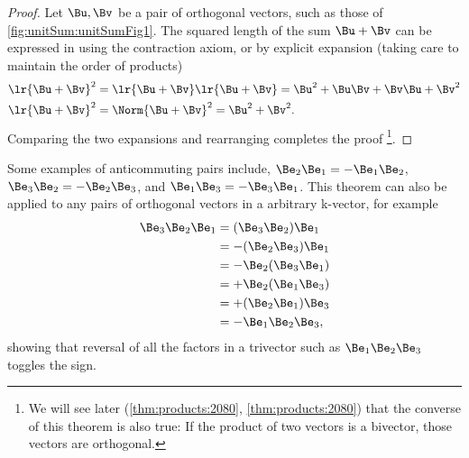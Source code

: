%
%

\begin{proof}
Let \( \Bu, \Bv \) be a pair of orthogonal vectors, such as those of
\cref{fig:unitSum:unitSumFig1}.  The squared length of the sum \( \Bu + \Bv \) can be expressed in using
the contraction axiom, or by explicit expansion (taking care to maintain the order of products)
\begin{align*}
\lr{ \Bu + \Bv }^2 &= \lr{ \Bu + \Bv }\lr{ \Bu + \Bv } = \Bu^2 + \Bu \Bv + \Bv \Bu + \Bv^2 \\
\lr{ \Bu + \Bv }^2 &= \Norm{ \Bu + \Bv }^2 = \Bu^2 + \Bv^2.
\end{align*}
Comparing the two expansions and rearranging completes the proof%
\footnote{We will see later (\cref{thm:products:2080}, \cref{thm:products:2080}) that the converse of this theorem is also true: If the product of two vectors is a bivector, those vectors are orthogonal.}.
\end{proof}

Some examples of anticommuting pairs include,
\( \Be_2 \Be_1 = -\Be_1 \Be_2 \),
\( \Be_3 \Be_2 = -\Be_2 \Be_3 \), and
\( \Be_1 \Be_3 = -\Be_3 \Be_1 \).  This theorem can also be applied to any pairs of orthogonal vectors in a arbitrary k-vector, for example
\begin{equation}\label{eqn:normalVectors:300}
\begin{aligned}
\Be_3 \Be_2 \Be_1
&= (\Be_3 \Be_2) \Be_1 \\
&= -(\Be_2 \Be_3) \Be_1 \\
&= -\Be_2 (\Be_3 \Be_1) \\
&= +\Be_2 (\Be_1 \Be_3) \\
&= +(\Be_2 \Be_1) \Be_3 \\
&= -\Be_1 \Be_2 \Be_3,
\end{aligned}
\end{equation}
showing that reversal of all the factors in a trivector such as \( \Be_1 \Be_2 \Be_3 \) toggles the sign.

